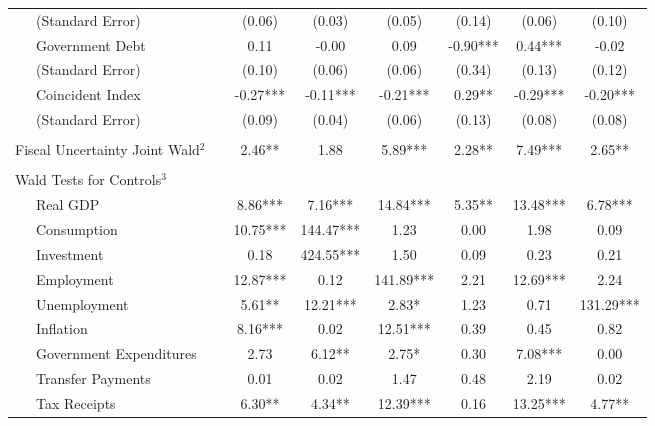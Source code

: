 \begin{table}
{\begin{center}
\begin{tabular}{l|S[table-format=3.2] S[table-format=3.2] S[table-format=3.2] S[table-format=3.2] S[table-format=3.2] S[table-format=3.2]}
~~~(Standard Error) & (0.06) & (0.03) & (0.05) & (0.14) & (0.06) & (0.10) \\ [0.2pc]
~~~Government Debt & 0.11 & -0.00 & 0.09 & -0.90*** & 0.44*** & -0.02 \\
~~~(Standard Error) & (0.10) & (0.06) & (0.06) & (0.34) & (0.13) & (0.12) \\ [0.2pc]
~~~Coincident Index & -0.27*** & -0.11*** & -0.21*** & 0.29** & -0.29*** & -0.20*** \\
~~~(Standard Error) & (0.09) & (0.04) & (0.06) & (0.13) & (0.08) & (0.08) \\ [0.2pc]
\hline
 &  \\ [-0.25pc]
Fiscal Uncertainty Joint Wald$^2$~~ & 2.46** & 1.88 & 5.89*** & 2.28** & 7.49*** & 2.65** \\ [0.5pc] \hline
 &  \\ [-0.25pc]
Wald Tests for Controls$^3$ &  \\ [0.5pc]
~~~Real GDP & 8.86*** & 7.16*** & 14.84*** & 5.35** & 13.48*** & 6.78*** \\
~~~Consumption & 10.75*** & 144.47*** & 1.23 & 0.00 & 1.98 & 0.09 \\
~~~Investment & 0.18 & 424.55*** & 1.50 & 0.09 & 0.23 & 0.21 \\
~~~Employment & 12.87*** & 0.12 & 141.89*** & 2.21 & 12.69*** & 2.24 \\
~~~Unemployment & 5.61** & 12.21*** & 2.83* & 1.23 & 0.71 & 131.29*** \\
~~~Inflation & 8.16*** & 0.02 & 12.51*** & 0.39 & 0.45 & 0.82 \\
~~~Government Expenditures & 2.73 & 6.12** & 2.75* & 0.30 & 7.08*** & 0.00 \\
~~~Transfer Payments & 0.01 & 0.02 & 1.47 & 0.48 & 2.19 & 0.02 \\
~~~Tax Receipts & 6.30** & 4.34** & 12.39*** & 0.16 & 13.25*** & 4.77** \\



\end{tabular}
\end{center}}
\end{table}
